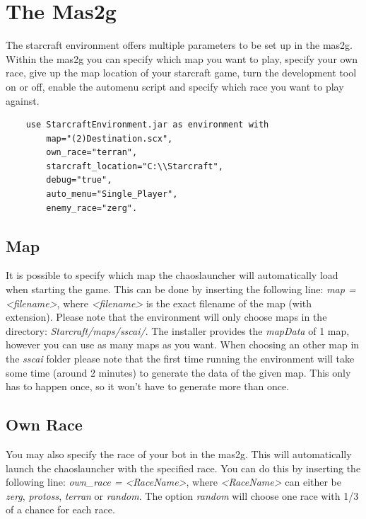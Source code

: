 \section{The Mas2g}
\label{mas2g}
The starcraft environment offers multiple parameters to be set up in the mas2g. Within the mas2g you can specify which map you want to play, specify your own race, give up the map location of your starcraft game, turn the development tool on or off, enable the automenu script and specify which race you want to play against.

\begin{verbatim}
    use StarcraftEnvironment.jar as environment with
        map="(2)Destination.scx",
        own_race="terran",
        starcraft_location="C:\\Starcraft",
        debug="true",
        auto_menu="Single_Player",
        enemy_race="zerg".
\end{verbatim}

\subsection{Map}
\label{map}
It is possible to specify which map the chaoslauncher will automatically load when starting the game. This can be done by inserting the following line: \textit{map = <filename>}, where \textit{<filename>} is the exact filename of the map (with extension). Please note that the environment will only choose maps in the directory: \textit{Starcraft/maps/sscai/}. The installer provides the \textit{mapData} of 1 map, however you can use as many maps as you want. When choosing an other map in the \textit{sscai} folder please note that the first time running the environment will take some time (around 2 minutes) to generate the data of the given map. This only has to happen once, so it won't have to generate more than once.

\subsection{Own Race}
\label{own race}
You may also specify the race of your bot in the mas2g. This will automatically launch the chaoslauncher with the specified race. You can do this by inserting the following line: \textit{own\_race = <RaceName>}, where \textit{<RaceName>} can either be \textit{zerg}, \textit{protoss}, \textit{terran} or \textit{random}. The option \textit{random} will choose one race with 1/3 of a chance for each race. 


